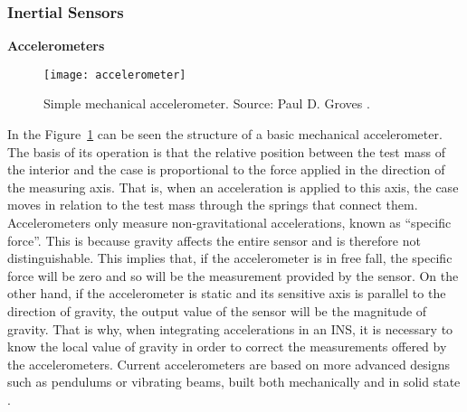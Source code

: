 \subsubsection{Inertial Sensors}
\label{sec:2_3_1_1_DR_INS_IMU}
\begin{description}
	\item \textbf{Accelerometers}
	\begin{figure}[!t]
		\centering
		\texttt{[image: accelerometer]}    	
		\caption[Simple mechanical accelerometer]{Simple mechanical accelerometer. Source: Paul D. Groves \cite{groves_navigation_2015}.}
		\label{fig:accelerometer}
	\end{figure}
	
	In the Figure~\ref{fig:accelerometer} can be seen the structure of a basic mechanical accelerometer.
	The basis of its operation is that the relative position between the test mass of the interior and the case is proportional to the force applied in the direction of the measuring axis. 
	That is, when an acceleration is applied to this axis, the case moves in relation to the test mass through the springs that connect them.
	Accelerometers only measure non-gravitational accelerations, known as ``specific force''.
	This is because gravity affects the entire sensor and is therefore not distinguishable.
	This implies that, if the accelerometer is in free fall, the specific force will be zero and so will be the measurement provided by the sensor.
	On the other hand, if the accelerometer is static and its sensitive axis is parallel to the direction of gravity, the output value of the sensor will be the magnitude of gravity.
	That is why, when integrating accelerations in an INS, it is necessary to know the local value of gravity in order to correct the measurements offered by the accelerometers.	
	Current accelerometers are based on more advanced designs such as pendulums or vibrating beams, built both mechanically and in solid state \cite{titterton_strapdown_2004}.
	

\end{description}
